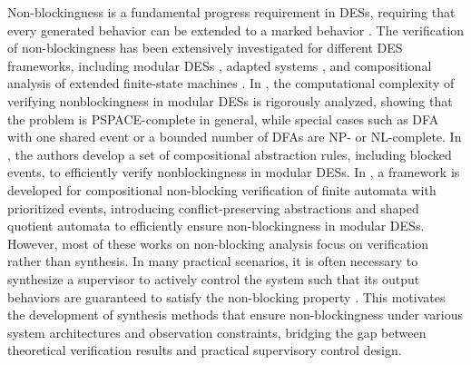 \documentclass[journal,twoside,web]{ieeecolor}
\begin{document}
Non-blockingness is a fundamental progress requirement in DESs, requiring that every generated behavior can be extended to a marked behavior \cite{chen1991dealing}.
%
The verification of non-blockingness has been extensively investigated for different DES frameworks, including modular DESs \cite{tang2024compositional}, adapted systems \cite{thuijsman2024transformational}, and compositional analysis of extended finite-state machines \cite{mohajerani2016framework}.
%
In \cite{tomas2018complexity}, the computational complexity of verifying nonblockingness in modular DESs is rigorously analyzed, showing that the problem is PSPACE-complete in general, while special cases such as DFA with one shared event or a bounded number of DFAs are NP- or NL-complete.
%
In \cite{pilbrow2015algorithm}, the authors develop a set of compositional abstraction rules, including blocked events, to efficiently verify nonblockingness in modular DESs.
%
In \cite{tang2024compositional}, a framework is developed for compositional non-blocking verification of finite automata with prioritized events, introducing conflict-preserving abstractions and shaped quotient automata to efficiently ensure non-blockingness in modular DESs.
%
However, most of these works on non-blocking analysis focus on verification rather than synthesis. In many practical scenarios, it is often necessary to synthesize a supervisor to actively control the system such that its output behaviors are guaranteed to satisfy the non-blocking property \cite{chen1991dealing, malik2013compositional}. 
This motivates the development of synthesis methods that ensure non-blockingness under various system architectures and observation constraints, bridging the gap between theoretical verification results and practical supervisory control design.
\end{document}
